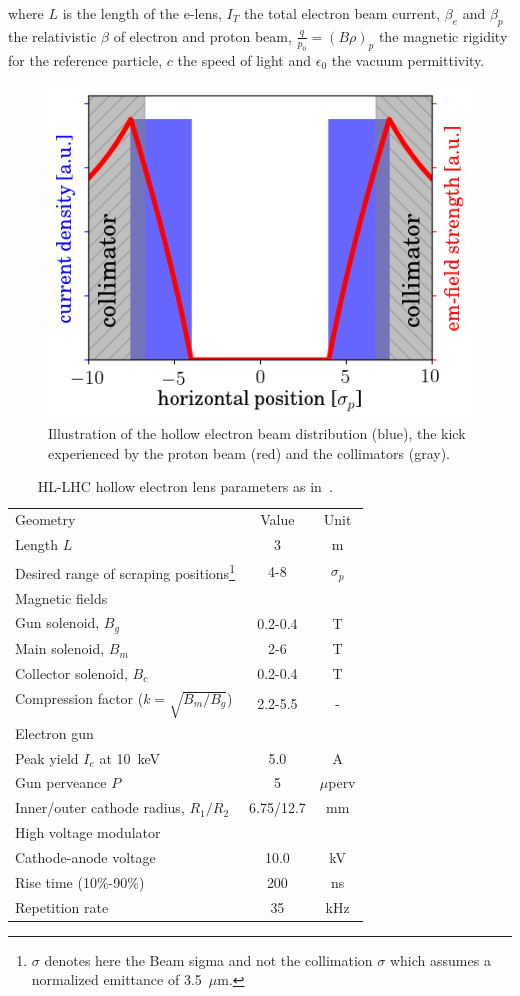 \documentclass[%
 reprint,
 amsmath,amssymb,
 aps,
prstab,
]{revtex4-1}
\begin{document}
where $L$ is the length of the e-lens, $I_T$ the total electron beam current, $\beta_{e}$ and $\beta_{p}$ the relativistic $\beta$ of electron and proton beam, $\frac{q}{p_0}=\left(B\rho\right)_p$ the magnetic rigidity for the reference particle, $c$ the speed of light and $\epsilon_0$ the vacuum permittivity.
\begin{figure}[b]
	\includegraphics[width=0.8\linewidth]{kick_hel_lhc_no_grid}%
	\caption{\label{fig:hel_field} Illustration of the hollow electron beam distribution (blue), the kick experienced by the proton beam (red) and the collimators (gray).}
\end{figure}
\begin{table}[t]
	\caption{\label{tab:hel_param}%
		HL-LHC hollow electron lens parameters as in~\cite{hel_cdr}.
	}
	\begin{ruledtabular}
		\begin{tabular}{lcc}
			Geometry & Value& Unit\\
			\colrule
		Length $L$    &  3 & m\\
		Desired range of scraping positions\footnote{$\sigma$ denotes here the Beam sigma and not the collimation $\sigma$ which assumes a normalized emittance of 3.5~$\mu$m.} & 4-8 &$\sigma_p$\\
		\colrule
		Magnetic fields & & \\
		\colrule
		Gun solenoid, $B_g$ & 0.2-0.4 & T\\
		Main solenoid, $B_m$ & 2-6 & T\\
		Collector solenoid, $B_c$ & 0.2-0.4 & T\\
		Compression factor ($k=\sqrt{B_m/B_g}$) & 2.2-5.5 & -\\
		\colrule
		Electron gun & & \\
		\colrule
		Peak yield $I_e$ at 10~keV & 5.0 & A\\
		Gun perveance $P$ & 5 & $\mu$perv\\
		Inner/outer cathode radius, $R_1/R_2$ & 6.75/12.7 & mm\\
		\colrule
		High voltage modulator & & \\
		\colrule
		Cathode-anode voltage & 10.0 & kV\\
		Rise time (10\%-90\%) & 200 & ns \\
		Repetition rate & 35 & kHz
		\end{tabular}
	\end{ruledtabular}
\end{table}
\end{document}
